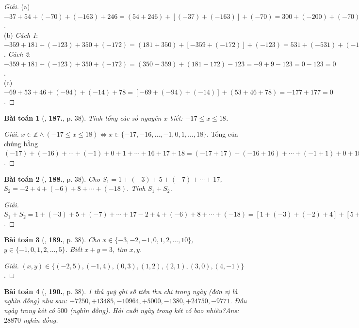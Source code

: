\documentclass{article}
\numberwithin{equation}{section}
\newtheorem{baitoan}{Bài toán}
\begin{document}
\begin{proof}[Giải]
	(a) $-37 + 54 + (-70) + (-163) + 246 = (54 + 246) + [(-37) + (-163)] + (-70) = 300 + (-200) + (-70) = 100 - 70 = 30$.\\(b) \textit{Cách 1}: $-359 + 181 + (-123) + 350 + (-172) = (181 + 350) + [-359 + (-172)] + (-123) = 531 + (-531) + (-123) = 0 - 123 = -123$. \textit{Cách 2}: $-359 + 181 + (-123) + 350 + (-172) = (350 - 359) + (181 - 172) - 123 = -9 + 9 - 123 = 0 - 123 = 0$.\\(c) $-69 + 53 + 46 + (-94) + (-14) + 78 = [-69 + (-94) + (-14)] + (53 + 46 + 78) = -177 + 177 = 0$.
\end{proof}

\begin{baitoan}[\cite{Tuyen_Toan_6}, \textbf{187.}, p. 38]
	Tính tổng các số nguyên $x$ biết: $-17\le x\le18$.
\end{baitoan}

\begin{proof}[Giải]
	$x\in\mathbb{Z}\land(-17\le x\le18)\Leftrightarrow x\in\{-17,-16,\ldots,-1,0,1,\ldots,18\}$. Tổng của chúng bằng $(-17) + (-16) + \cdots + (-1) + 0 + 1 + \cdots + 16 + 17 + 18 = (-17 + 17) + (-16 + 16) + \cdots + (-1 + 1) + 0 + 18 = 0 + 0 + \cdots + 0 + 0 + 18 = 18$. 
\end{proof}

\begin{baitoan}[\cite{Tuyen_Toan_6}, \textbf{188.}, p. 38]
	Cho $S_1 = 1 + (-3) + 5 + (-7) + \cdots + 17$, $S_2 = -2 + 4 + (-6) + 8 + \cdots + (-18)$. Tính $S_1 + S_2$.
\end{baitoan}

\begin{proof}[Giải]
	$S_1 + S_2 = 1 + (-3) + 5 + (-7) + \cdots + 17 - 2 + 4 + (-6) + 8 + \cdots + (-18) = [1 + (-3) + (-2) + 4] + [5 + (-7) + (-6) + 8] + \cdots + [13 + (-15) + (-14) + 16] + [17 + (-18)] = 0 + 0 + \cdots + 0 + (-1) = -1$.
\end{proof}

\begin{baitoan}[\cite{Tuyen_Toan_6}, \textbf{189.}, p. 38]
	Cho $x\in\{-3,-2,-1,0,1,2,\ldots,10\}$, $y\in\{-1,0,1,2,\ldots,5\}$. Biết $x + y = 3$, tìm $x,y$.
\end{baitoan}

\begin{proof}[Giải]
	$(x,y)\in\{(-2,5),(-1,4),(0,3),(1,2),(2,1),(3,0),(4,-1)\}$.
\end{proof}

\begin{baitoan}[\cite{Tuyen_Toan_6}, \textbf{190.}, p. 38]
	1 thủ quỹ ghi số tiền thu chi trong ngày (đơn vị là nghìn đồng) như sau: $+7250,+13485,-10964,+5000,-1380,+24750,-9771$. Đầu ngày trong két có $500$ (nghìn đồng). Hỏi cuối ngày trong két có bao nhiêu?\hfill{\sf Ans:} $28870$ nghìn đồng.
\end{baitoan}
\end{document}
